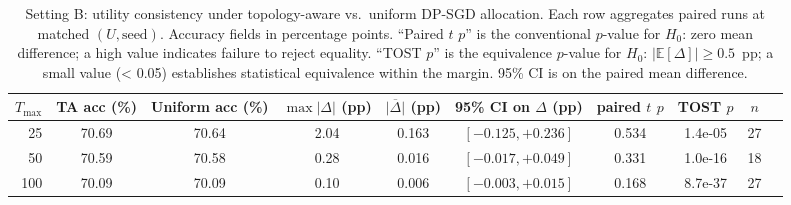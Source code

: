 \begin{table}[t]
\centering
\caption{Setting B: utility consistency under topology-aware vs.\ uniform DP-SGD allocation. Each row aggregates paired runs at matched $(U, \text{seed})$. Accuracy fields in percentage points. ``Paired $t$ $p$'' is the conventional $p$-value for $H_0$: zero mean difference; a high value indicates failure to reject equality. ``TOST $p$'' is the equivalence $p$-value for $H_0$: $|\mathbb{E}[\Delta]|\ge 0.5$~pp; a small value (< 0.05) establishes statistical equivalence within the margin. 95\% CI is on the paired mean difference.}
\label{tab:util-consistency-b}
\begin{tabular}{@{}rccccccccc@{}}
\toprule
$T_{\max}$ & TA acc (\%) & Uniform acc (\%) & $\max|\Delta|$ (pp) & $\overline{|\Delta|}$ (pp) & 95\% CI on $\Delta$ (pp) & paired $t$ $p$ & TOST $p$ & $n$ \\
\midrule
25 & 70.69 & 70.64 & 2.04 & 0.163 & $[-0.125, +0.236]$ & 0.534 & 1.4e-05 & 27 \\
50 & 70.59 & 70.58 & 0.28 & 0.016 & $[-0.017, +0.049]$ & 0.331 & 1.0e-16 & 18 \\
100 & 70.09 & 70.09 & 0.10 & 0.006 & $[-0.003, +0.015]$ & 0.168 & 8.7e-37 & 27 \\
\bottomrule
\end{tabular}
\end{table}
